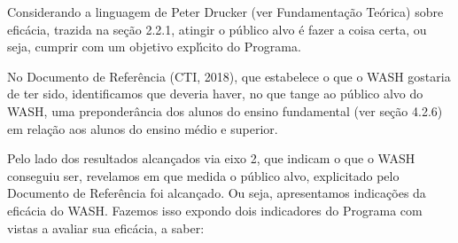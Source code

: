 \documentclass[
12pt,		%
openright,	%
twoside,  %
a4paper,			%
chapter=TITLE,		%
english,			%
french,				%
spanish,			%
brazil				%
]{USPSC-classe/USPSC}
\begin{document}
Considerando a linguagem de Peter Drucker (ver Fundamenta\c{c}\~ao Te\'orica) sobre efic\'acia, trazida na se\c{c}\~ao 2.2.1, atingir o p\'ublico alvo \'e \textquotedbl fazer a coisa certa\textquotedbl , ou seja, cumprir com um objetivo expl\'{\i}cito do Programa.

















No Documento de Refer\^encia (CTI, 2018), que estabelece \textquotedbl o que o WASH gostaria de ter sido\textquotedbl , identificamos que deveria haver, no que tange ao p\'ublico alvo do WASH, uma preponder\^ancia dos alunos do ensino fundamental (ver se\c{c}\~ao 4.2.6) em rela\c{c}\~ao aos alunos do ensino m\'edio e superior.

















Pelo lado dos resultados alcan\c{c}ados via eixo 2, que indicam \textquotedbl o que o WASH conseguiu ser\textquotedbl , revelamos em que medida o p\'ublico alvo, explicitado pelo  Documento de Refer\^encia foi alcan\c{c}ado. Ou seja, apresentamos indica\c{c}\~oes da efic\'acia do WASH. Fazemos isso expondo dois indicadores do Programa com vistas a avaliar sua efic\'acia, a saber:
\end{document}
